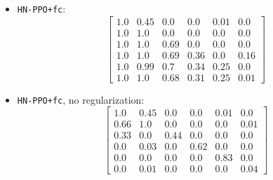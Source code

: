 \documentclass[dvipsnames]{article} %
\begin{document}
\begin{itemize}
\item \texttt{HN-PPO+fc}:
\[\left[\begin{array}{cccccc}
1.0& 0.45& 0.0& 0.0& 0.01& 0.0\\
1.0& 1.0& 0.0& 0.0& 0.0& 0.0\\
1.0& 1.0& 0.69& 0.0& 0.0& 0.0\\
1.0& 1.0& 0.69& 0.36& 0.0& 0.16\\
1.0& 0.99& 0.7& 0.34& 0.25& 0.0\\
1.0& 1.0& 0.68& 0.31& 0.25& 0.01
\end{array}\right]\]

\item \texttt{HN-PPO+fc}, no regularization:
\[\left[\begin{array}{cccccc}
1.0& 0.45& 0.0& 0.0& 0.01& 0.0\\
0.66& 1.0& 0.0& 0.0& 0.0& 0.01\\
0.33& 0.0& 0.44& 0.0& 0.0& 0.0\\
0.0& 0.03& 0.0& 0.62& 0.0& 0.0\\
0.0& 0.0& 0.0& 0.0& 0.83& 0.0\\
0.0& 0.01& 0.0& 0.0& 0.0& 0.04
\end{array}\right]\]
\end{itemize}

\end{document}
